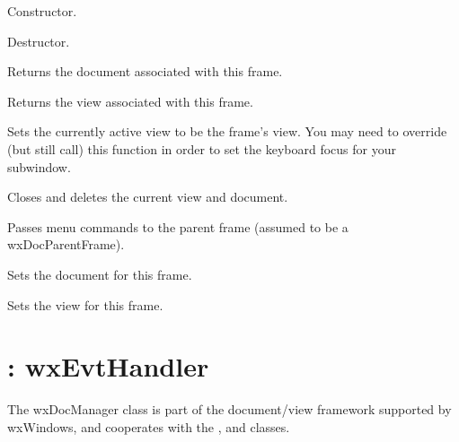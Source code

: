 Constructor.



Destructor.



Returns the document associated with this frame.



Returns the view associated with this frame.



Sets the currently active view to be the frame's view. You may need
to override (but still call) this function in order to set the keyboard
focus for your subwindow.



Closes and deletes the current view and document.



Passes menu commands to the parent frame (assumed to be a wxDocParentFrame).



Sets the document for this frame.



Sets the view for this frame.



\section{: wxEvtHandler}\label{wxdocmanager}


The wxDocManager class is part of the document/view framework supported by wxWindows,
and cooperates with the , \rtfsp
and  classes.

